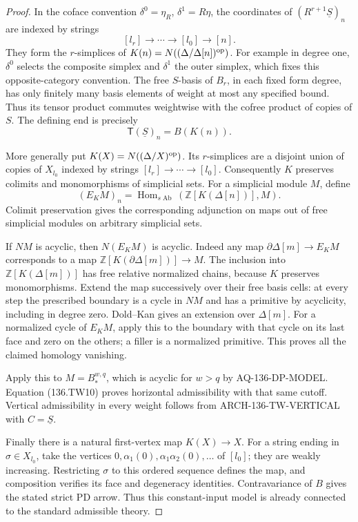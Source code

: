 \begin{proof}
In the coface convention $\delta^0=\eta_R$,
$\delta^1=R\eta$, the coordinates of
$(R^{r+1}\underline S)_n$ are indexed by strings
\[
 [l_r]\longrightarrow\cdots\longrightarrow[l_0]
                                      \longrightarrow[n].
\]
They form the $r$-simplices of
$K(n)=N((\Delta/\Delta[n])^{\rm op})$.
For example in degree one, $\delta^0$ selects the
composite simplex and $\delta^1$ the outer simplex,
which fixes this opposite-category convention.
The free $S$-basis of $B_r$, in each fixed form degree,
has only finitely many basis elements of weight at most
any specified bound. Thus its tensor product commutes
weightwise with the cofree product of copies of $S$.
The defining end is precisely
\[
               \mathsf T(\underline S)_n=B(K(n)).       \tag{136.TW10}
\]

More generally put $K(X)=N((\Delta/X)^{\rm op})$.
Its $r$-simplices are a disjoint union of copies of
$X_{l_0}$ indexed by strings
$[l_r]\to\cdots\to[l_0]$. Consequently $K$ preserves
colimits and monomorphisms of simplicial sets.
For a simplicial module $M$, define
\[
                  (E_KM)_n=
                  \operatorname{Hom}_{s\operatorname{Ab}}
                            (\mathbb Z[K(\Delta[n])],M).
\]
Colimit preservation gives the corresponding adjunction
on maps out of free simplicial modules on arbitrary
simplicial sets.

If $NM$ is acyclic, then $N(E_KM)$ is acyclic.
Indeed any map $\partial\Delta[m]\to E_KM$ corresponds
to a map $\mathbb Z[K(\partial\Delta[m])]\to M$.
The inclusion into $\mathbb Z[K(\Delta[m])]$ has free
relative normalized chains, because $K$ preserves
monomorphisms. Extend the map successively over their
free basis cells: at every step the prescribed boundary
is a cycle in $NM$ and has a primitive by acyclicity,
including in degree zero. Dold--Kan gives an extension
over $\Delta[m]$. For a normalized cycle of $E_KM$,
apply this to the boundary with that cycle on its last
face and zero on the others; a filler is a normalized
primitive. This proves all the claimed homology vanishing.

Apply this to $M=B_*^{w,q}$, which is acyclic for $w>q$
by AQ-136-DP-MODEL. Equation (136.TW10) proves horizontal
admissibility with that same cutoff. Vertical admissibility
in every weight follows from ARCH-136-TW-VERTICAL with
$C=\underline S$.

Finally there is a natural first-vertex map $K(X)\to X$.
For a string ending in $\sigma\in X_{l_0}$, take the
vertices $0,\alpha_1(0),\alpha_1\alpha_2(0),\ldots$
of $[l_0]$; they are weakly increasing. Restricting
$\sigma$ to this ordered sequence defines the map,
and composition verifies its face and degeneracy
identities. Contravariance of $B$ gives the stated
strict PD arrow. Thus this constant-input model is
already connected to the standard admissible theory.
\end{proof}

